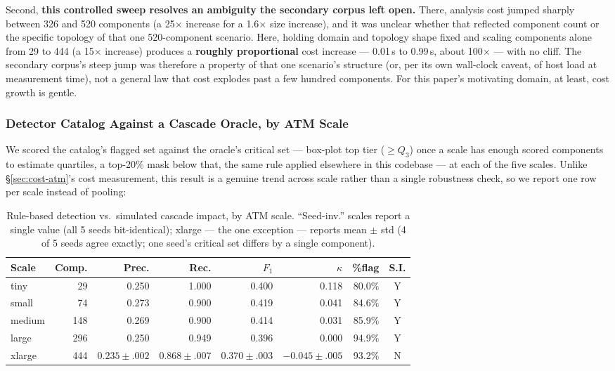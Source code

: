 \documentclass[sigconf,9pt]{acmart}
\begin{document}
Second, \textbf{this controlled sweep resolves an ambiguity the secondary corpus left open.}
There, analysis cost jumped sharply between 326 and 520 components (a 25$\times$ increase for a
1.6$\times$ size increase), and it was unclear whether that reflected component count or the
specific topology of that one 520-component scenario. Here, holding domain and topology shape
fixed and scaling components alone from 29 to 444 (a 15$\times$ increase) produces a
\textbf{roughly proportional} cost increase --- 0.01\,s to 0.99\,s, about 100$\times$ --- with no
cliff. The secondary corpus's steep jump was therefore a property of that one scenario's structure
(or, per its own wall-clock caveat, of host load at measurement time), not a general law that cost
explodes past a few hundred components. For this paper's motivating domain, at least, cost growth
is gentle.

\subsubsection{Detector Catalog Against a Cascade Oracle, by ATM Scale}
\label{sec:catalog-atm}

We scored the catalog's flagged set against the oracle's critical set --- box-plot top tier
($\ge Q_3$) once a scale has enough scored components to estimate quartiles, a top-20\% mask below
that, the same rule applied elsewhere in this codebase --- at each of the five scales. Unlike
\S\ref{sec:cost-atm}'s cost measurement, this result is a genuine trend across scale rather than a
single robustness check, so we report one row per scale instead of pooling:

\begin{table}[t]
\caption{Rule-based detection vs.\ simulated cascade impact, by ATM scale. ``Seed-inv.'' scales
report a single value (all 5 seeds bit-identical); xlarge --- the one exception --- reports
mean $\pm$ std (4 of 5 seeds agree exactly; one seed's critical set differs by a single
component).}
\label{tab:catalog}
\tiny
\setlength{\tabcolsep}{2pt}
\begin{tabular}{@{}lrrrrrrc@{}}
\toprule
\textbf{Scale} & \textbf{Comp.} & \textbf{Prec.} & \textbf{Rec.} & \textbf{$F_1$} &
\textbf{$\kappa$} & \textbf{\%flag} & \textbf{S.I.} \\
\midrule
tiny   & 29  & 0.250 & 1.000 & 0.400 & 0.118 & 80.0\% & Y \\
small  & 74  & 0.273 & 0.900 & 0.419 & 0.041 & 84.6\% & Y \\
medium & 148 & 0.269 & 0.900 & 0.414 & 0.031 & 85.9\% & Y \\
large  & 296 & 0.250 & 0.949 & 0.396 & 0.000 & 94.9\% & Y \\
xlarge & 444 & $0.235{\pm}.002$ & $0.868{\pm}.007$ & $0.370{\pm}.003$ & $-0.045{\pm}.005$ & 93.2\% & N \\
\bottomrule
\end{tabular}
\end{table}
\end{document}
